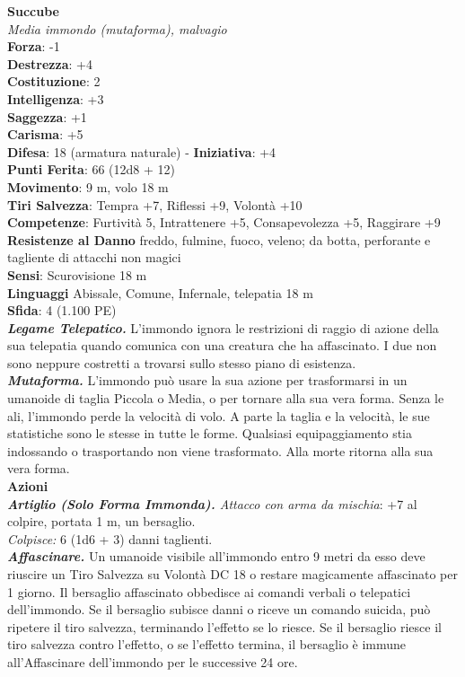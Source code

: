 \begin{multicols}{2}
\medskip\textbf{Succube}\\
\emph{Media immondo (mutaforma), malvagio}\\
\textbf{Forza}: -1\\
\textbf{Destrezza}: +4\\
\textbf{Costituzione}: 2\\
\textbf{Intelligenza}: +3\\
\textbf{Saggezza}: +1\\
\textbf{Carisma}: +5\\
\textbf{Difesa}: 18 (armatura naturale) - \textbf{Iniziativa}: +4\\
\textbf{Punti Ferita}: 66 (12d8 + 12)\\
\textbf{Movimento}: 9 m, volo 18 m\\
\textbf{Tiri Salvezza}: Tempra +7, Riflessi +9, Volontà +10\\
\textbf{Competenze}: Furtività 5, Intrattenere +5, Consapevolezza +5, Raggirare +9\\
\textbf{Resistenze al Danno} freddo, fulmine, fuoco, veleno; da botta, perforante e tagliente di attacchi non magici\\
\textbf{Sensi}: Scurovisione 18 m\\
\textbf{Linguaggi} Abissale, Comune, Infernale, telepatia 18 m \\
\textbf{Sfida}: 4 (1.100 PE)\smallskip\\
\emph{\textbf{Legame Telepatico.}} L'immondo ignora le restrizioni di raggio di azione della sua telepatia quando comunica con una creatura che ha affascinato. I due non sono neppure costretti a trovarsi sullo stesso piano di esistenza.\\
\emph{\textbf{Mutaforma.}} L'immondo può usare la sua azione per trasformarsi in un umanoide di taglia Piccola o Media, o per tornare alla sua vera forma. Senza le ali, l'immondo perde la velocità di volo. A parte la taglia e la velocità, le sue statistiche sono le stesse in tutte le forme. Qualsiasi equipaggiamento stia indossando o trasportando non viene trasformato. Alla morte ritorna alla sua vera forma. \\
\smallskip\textbf{Azioni}\\
\emph{\textbf{Artiglio (Solo Forma Immonda).} Attacco con arma da mischia}: +7 al colpire, portata 1 m, un bersaglio.\\
\emph{Colpisce:} 6 (1d6 + 3) danni taglienti.\\
\emph{\textbf{Affascinare.}} Un umanoide visibile all'immondo entro 9 metri da esso deve riuscire un Tiro Salvezza su Volontà DC  18 o restare magicamente affascinato per 1 giorno. Il bersaglio affascinato obbedisce ai comandi verbali o telepatici dell'immondo. Se il bersaglio subisce danni o riceve un comando suicida, può ripetere il tiro salvezza, terminando l'effetto se lo riesce. Se il bersaglio riesce il tiro salvezza contro l'effetto, o se l'effetto termina, il bersaglio è immune all'Affascinare dell'immondo per le successive 24 ore.\\

\end{multicols}
